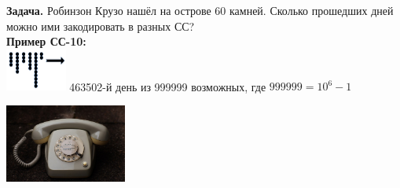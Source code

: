 \small{\textbf{Задача.} Робинзон Крузо нашёл на острове 60 камней. Сколько прошедших дней можно ими закодировать в разных СС?\\
\textbf{Пример СС-10:}\\
\includegraphics[width=2cm]{photo1_dop2.png}
463502-й день из 999999 возможных, где $999999 = 10^{6} - 1$\\
\begin{flushright}
    \includegraphics[width=4cm]{photo2_dop2.png}
\end{flushright}

}